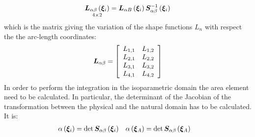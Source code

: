 \begin{equation}
\underset{ 4 \times 2 } { \TT{L}_{ \alpha \beta } \valxii }=
\TT{L}_{ \alpha B } \valxii \TT{S}_{\alpha \beta} ^{-1} \valxii
\end{equation}
which is the matrix giving the variation of the shape functions $L_n$ with respect the the arc-length coordinates:
\begin{equation}
\TT{L}_{\alpha \beta} =
\sqbr{ \matr{ c c }{
L_{1,1} & L_{1,2} \\
L_{2,1} & L_{2,2} \\
L_{3,1} & L_{3,2} \\
L_{4,1} & L_{4,2}
}}
\end{equation}
In order to perform the integration in the isoparametric domain the area element need to be calculated. In particular, the determinant of the Jacobian of the transformation between the physical and the natural domain has to be calculated. It is:
\begin{align}
\alpha \valxii & = \det \TT{S}_{\alpha \beta} \valxii &
\alpha \valxiA & = \det \TT{S}_{\alpha \beta} \valxiA
\end{align}
